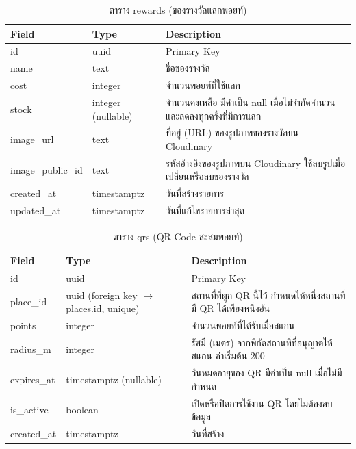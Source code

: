 \begin{table}[H]
\centering
\caption{ตาราง rewards (ของรางวัลแลกพอยท์)}
\label{tab:db_reward}
\begin{tabular}{|p{3.6cm}|p{2.6cm}|p{6.8cm}|}
\hline
\textbf{Field} & \textbf{Type} & \textbf{Description} \\
\hline
id & uuid & Primary Key \\ \hline
name & text & ชื่อของรางวัล \\ \hline
cost & integer & จำนวนพอยท์ที่ใช้แลก \\ \hline
stock & integer (nullable) & จำนวนคงเหลือ มีค่าเป็น null เมื่อไม่จำกัดจำนวน และลดลงทุกครั้งที่มีการแลก \\ \hline
image\_url & text & ที่อยู่ (URL) ของรูปภาพของรางวัลบน Cloudinary \\ \hline
image\_public\_id & text & รหัสอ้างอิงของรูปภาพบน Cloudinary ใช้ลบรูปเมื่อเปลี่ยนหรือลบของรางวัล \\ \hline
created\_at & timestamptz & วันที่สร้างรายการ \\ \hline
updated\_at & timestamptz & วันที่แก้ไขรายการล่าสุด \\
\hline
\end{tabular}
\end{table}

\begin{table}[H]
\centering
\caption{ตาราง qrs (QR Code สะสมพอยท์)}
\label{tab:db_qr}
\begin{tabular}{|p{3.6cm}|p{2.6cm}|p{6.8cm}|}
\hline
\textbf{Field} & \textbf{Type} & \textbf{Description} \\
\hline
id & uuid & Primary Key \\ \hline
place\_id & uuid (foreign key $\to$ places.id, unique) & สถานที่ที่ผูก QR นี้ไว้ กำหนดให้หนึ่งสถานที่มี QR ได้เพียงหนึ่งอัน \\ \hline
points & integer & จำนวนพอยท์ที่ได้รับเมื่อสแกน \\ \hline
radius\_m & integer & รัศมี (เมตร) จากพิกัดสถานที่ที่อนุญาตให้สแกน ค่าเริ่มต้น 200 \\ \hline
expires\_at & timestamptz (nullable) & วันหมดอายุของ QR มีค่าเป็น null เมื่อไม่มีกำหนด \\ \hline
is\_active & boolean & เปิดหรือปิดการใช้งาน QR โดยไม่ต้องลบข้อมูล \\ \hline
created\_at & timestamptz & วันที่สร้าง \\
\hline
\end{tabular}
\end{table}


